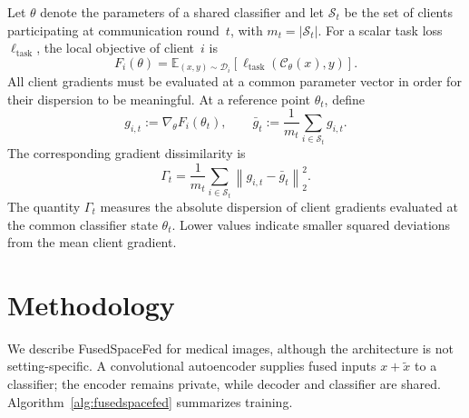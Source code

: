 \documentclass[twoside]{article}
\theoremstyle{thmstyleone}%
\theoremstyle{thmstyletwo}%
\theoremstyle{thmstylethree}%
\begin{document}
Let $\theta$ denote the parameters of a shared classifier and let
$\mathcal{S}_t$ be the set of clients participating at communication round~$t$,
with $m_t=|\mathcal{S}_t|$. For a scalar task loss $\ell_{\mathrm{task}}$, the
local objective of client~$i$ is
\begin{equation*}
F_i(\theta)
=
\mathbb{E}_{(x,y)\sim\mathcal{D}_i}
\left[
\ell_{\mathrm{task}}\!\left(\mathcal{C}_{\theta}(x),y\right)
\right].
\end{equation*}
All client gradients must be evaluated at a common parameter vector in order
for their dispersion to be meaningful. At a reference point $\theta_t$, define
\[
g_{i,t}:=\nabla_{\theta}F_i(\theta_t),\qquad
\bar g_t:=\frac{1}{m_t}\sum_{i\in\mathcal S_t}g_{i,t}.
\]
The corresponding gradient dissimilarity is
\begin{equation}
\label{eq:gradient_dissimilarity}
\Gamma_t
=
\frac{1}{m_t}
\sum_{i\in\mathcal{S}_t}
\left\|g_{i,t}-\bar{g}_t\right\|_2^2.
\end{equation}
The quantity $\Gamma_t$ measures the absolute dispersion of client gradients
evaluated at the common classifier state $\theta_t$. Lower values indicate
smaller squared deviations from the mean client gradient.




\section{Methodology}\label{sec:method}

We describe FusedSpaceFed for medical images, although the architecture is not
setting-specific. A convolutional autoencoder supplies fused inputs
$x+\tilde{x}$ to a classifier; the encoder remains private, while decoder and
classifier are shared. Algorithm~\ref{alg:fusedspacefed} summarizes training.
\end{document}
